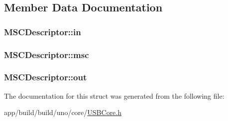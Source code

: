 \subsection{Member Data Documentation}
\hypertarget{struct_m_s_c_descriptor_a9ae4c4c01f7b1f9ed6c16bbd8793dfd9}{
\subsubsection[{in}]{ M\-S\-C\-Descriptor\-::in}}\label{struct_m_s_c_descriptor_a9ae4c4c01f7b1f9ed6c16bbd8793dfd9}
\hypertarget{struct_m_s_c_descriptor_ad1df90234c1714bd3ffa34c0a28d4621}{
\subsubsection[{msc}]{ M\-S\-C\-Descriptor\-::msc}}\label{struct_m_s_c_descriptor_ad1df90234c1714bd3ffa34c0a28d4621}
\hypertarget{struct_m_s_c_descriptor_a2e9b0bbe81b8b510cd182c70560c33eb}{
\subsubsection[{out}]{ M\-S\-C\-Descriptor\-::out}}\label{struct_m_s_c_descriptor_a2e9b0bbe81b8b510cd182c70560c33eb}


The documentation for this struct was generated from the following file\-:\begin{DoxyCompactItemize}
\item 
app/build/build/uno/core/\hyperlink{_u_s_b_core_8h}{U\-S\-B\-Core.\-h}\end{DoxyCompactItemize}
